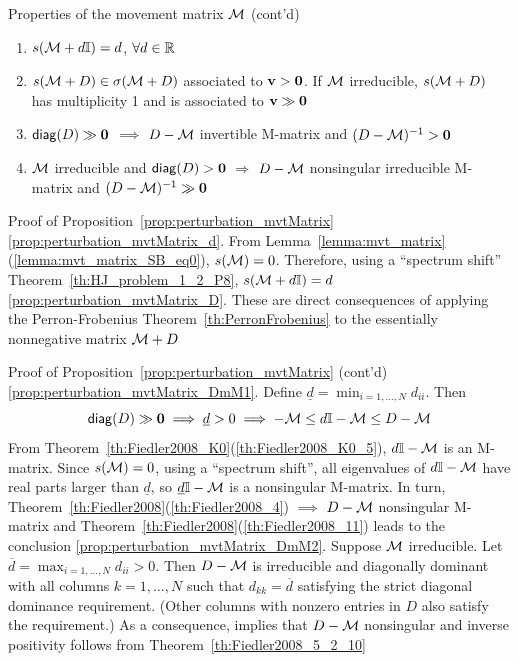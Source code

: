 \documentclass[aspectratio=169]{beamer}
\begin{document}
\begin{frame}{Properties of the movement matrix $\mathcal{M}$ (cont'd)}
	\begin{proposition}\label{prop:perturbation_mvtMatrix}
		\begin{enumerate}
			\item $s(\mathcal{M}+d\mathbb{I})=d$, $\forall d\in\mathbb{R}$ \label{prop:perturbation_mvtMatrix_d}
			\item $s(\mathcal{M}+D)\in\sigma(\mathcal{M}+D)$ associated to $\bv>\b0$. If $\mathcal{M}$ irreducible, $s(\mathcal{M}+D)$ has  multiplicity 1 and is associated to $\bv\gg \b0$ \label{prop:perturbation_mvtMatrix_D}
			\item $\diag (D)\gg \b0$ $\implies$ $D-\mathcal{M}$ invertible M-matrix and $(D-\M)^{-1}> \b0$ \label{prop:perturbation_mvtMatrix_DmM1}
			\item $\mathcal{M}$ irreducible and $\diag(D)>\b0$ $\Longrightarrow$ $D-\mathcal{M}$ nonsingular irreducible M-matrix and $(D-\M)^{-1}\gg \b0$ \label{prop:perturbation_mvtMatrix_DmM2}
		\end{enumerate}
	\end{proposition}
\end{frame}


\begin{frame}{Proof of Proposition~\ref{prop:perturbation_mvtMatrix}}
\ref{prop:perturbation_mvtMatrix_d}. From Lemma~\ref{lemma:mvt_matrix}(\ref{lemma:mvt_matrix_SB_eq0}), $s(\mathcal{M})=0$. Therefore, using a ``spectrum shift'' Theorem~\ref{th:HJ_problem_1_2_P8}, $s(\mathcal{M}+d\mathbb{I})=d$
\vfill
\noindent\ref{prop:perturbation_mvtMatrix_D}. These are direct consequences of applying the Perron-Frobenius Theorem~\ref{th:PerronFrobenius} to the essentially nonnegative matrix $\mathcal{M}+D$
\vfill
\end{frame}


\begin{frame}{Proof of Proposition~\ref{prop:perturbation_mvtMatrix} (cont'd)}
\noindent\ref{prop:perturbation_mvtMatrix_DmM1}.
Define $\underline{d}=\min_{i=1,\ldots,N}d_{ii}$. Then
\[
\diag (D)\gg \b0 \implies \underline{d}>0 \implies -\M\leq d\II-\M\leq D-\M
\]
From Theorem~\ref{th:Fiedler2008_K0}(\ref{th:Fiedler2008_K0_5}), $d\mathbb{I}-\mathcal{M}$ is an M-matrix. 
Since $s(\mathcal{M})=0$, using a ``spectrum shift'', all eigenvalues of $d\mathbb{I}-\mathcal{M}$ have real parts larger
than $\underline{d}$, so $\underline{d}\mathbb{I}-\mathcal{M}$ is a nonsingular M-matrix. 
In turn, Theorem~\ref{th:Fiedler2008}(\ref{th:Fiedler2008_4}) $\implies$ $D-\mathcal{M}$ nonsingular M-matrix and Theorem~\ref{th:Fiedler2008}(\ref{th:Fiedler2008_11}) leads to the conclusion
\vfill
\noindent\ref{prop:perturbation_mvtMatrix_DmM2}. 
Suppose $\mathcal{M}$ irreducible. 
Let $\overline{d}=\max_{i=1,\ldots,N}d_{ii}>0$.
Then $D-\mathcal{M}$ is  irreducible and diagonally dominant with all columns $k=1,\ldots,N$ such that $d_{kk}=\overline{d}$ satisfying the strict diagonal
dominance requirement. (Other columns with nonzero entries in $D$ also satisfy the requirement.)
As a consequence, \cite[Theorem 1.11]{Varga2010} implies that $D-\mathcal{M}$ nonsingular and inverse positivity follows from Theorem~\ref{th:Fiedler2008_5_2_10}
\end{frame}
\end{document}

